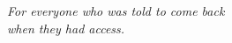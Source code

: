 \thispagestyle{empty}
\vspace*{2.6in}
\begin{center}
{\fontsize{12}{20}\selectfont\itshape
For everyone who was told to come back\\
when they had access.}
\end{center}
\clearpage

\thispagestyle{empty}\null\clearpage

\pagestyle{nlrmain}
